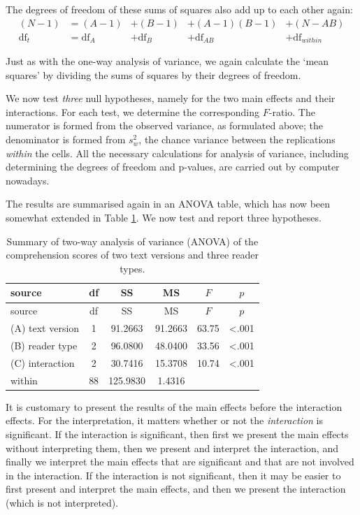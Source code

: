 \documentclass[
]{book}
\begin{document}
The degrees of freedom of these sums of squares also add up to each other
again:
\begin{align}
  \label{eq:dftotal2}
    { (N-1) } &= (A-1) &+ (B-1) &+ (A-1)(B-1) &+ (N-AB) \\
    \textrm{df}_t &= \textrm{df}_A &+ \textrm{df}_B &+ \textrm{df}_{AB} &+ \textrm{df}_{within}
\end{align}

Just as with the one-way analysis of variance, we again calculate the
`mean squares' by dividing the sums of squares by their degrees of freedom.

We now test \emph{three} null hypotheses, namely for the two main effects and their
interactions. For each test, we determine the corresponding
\(F\)-ratio. The numerator is formed from the observed variance,
as formulated above; the denominator is formed from \(s^2_w\), the
chance variance between the replications \emph{within} the cells. All
the necessary calculations for analysis of variance, including determining
the degrees of freedom and p-values, are carried out by computer
nowadays.

The results are summarised again in an ANOVA table, which has now been somewhat
extended in Table \ref{tab:DBE12anova}. We now test and report three hypotheses.

\begin{longtable}[]{@{}lccccc@{}}
\caption{\label{tab:DBE12anova} Summary of two-way analysis of variance (ANOVA) of the comprehension scores of two text versions and three reader types.}\tabularnewline
\toprule\noalign{}
source & df & SS & MS & \(F\) & \(p\) \\
\midrule\noalign{}
\endfirsthead
\toprule\noalign{}
source & df & SS & MS & \(F\) & \(p\) \\
\midrule\noalign{}
\endhead
\bottomrule\noalign{}
\endlastfoot
(A) text version & 1 & 91.2663 & 91.2663 & 63.75 & \textless.001 \\
(B) reader type & 2 & 96.0800 & 48.0400 & 33.56 & \textless.001 \\
(C) interaction & 2 & 30.7416 & 15.3708 & 10.74 & \textless.001 \\
within & 88 & 125.9830 & 1.4316 & & \\
\end{longtable}

It is customary to present the results of the main effects before the interaction effects.
For the interpretation, it matters whether or not the \emph{interaction} is significant.
If the interaction is significant, then first we present the main effects without interpreting them, then we present and interpret the interaction, and finally we interpret the main effects that are significant and that are not involved in the interaction.
If the interaction is not significant, then it may be easier to first present and interpret the main effects, and then we present the interaction (which is not interpreted).
\end{document}
